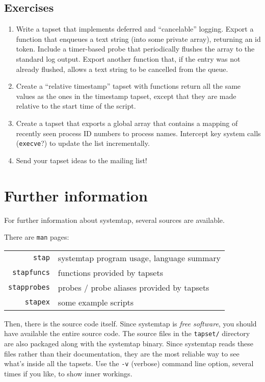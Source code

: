 \documentclass{article}
\renewcommand{\nomenclature}[2]{}
\begin{document}
\subsection{Exercises}

\begin{enumerate}
\item Write a tapset that implements deferred and ``cancelable''
logging.  Export a function that enqueues a text string (into some
private array), returning an id token.  Include a timer-based probe
that periodically flushes the array to the standard log output.
Export another function that, if the entry was not already flushed,
allows a text string to be cancelled from the queue.

\item Create a ``relative timestamp'' tapset with functions return all
the same values as the ones in the timestamp tapset, except that they
are made relative to the start time of the script.

\item Create a tapset that exports a global array that contains a
mapping of recently seen process ID numbers to process names.
Intercept key system calls (\verb+execve+?) to update the list
incrementally.

\item Send your tapset ideas to the mailing list!
\end{enumerate}

\section{Further information}

For further information about systemtap, several sources are available.

There are \verb+man+ pages:

\begin{tabular}{rl}
\verb+stap+ & systemtap program usage, language summary \\
\verb+stapfuncs+ & functions provided by tapsets \\
\verb+stapprobes+ & probes / probe aliases provided by tapsets \\
\verb+stapex+ & some example scripts \\
\end{tabular}

Then, there is the source code itself.  Since systemtap is {\em free
software}, you should have available the entire source code.  The
source files in the \verb+tapset/+ directory are also packaged along
with the systemtap binary.  Since systemtap reads these files rather
than their documentation, they are the most reliable way to see what's
inside all the tapsets.  Use the \verb+-v+ (verbose) command line
option, several times if you like, to show inner workings.
\nomenclature{free software}{Software licensed under terms such as the
GNU GPL, which aims to enforce certain specified user freedoms such
as study, modification, and sharing.}
\end{document}
